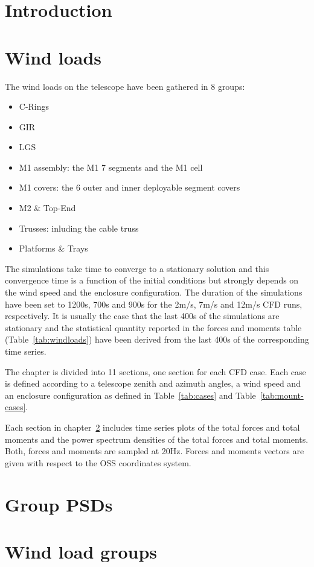 \documentclass{gmto-book}
\begin{document}
\clearpage

\chapter{Introduction}
\label{sec:introduction}



%
\chapter{Wind loads}
\label{cfd-wind-loads}

The wind loads on the telescope have been gathered in 8 groups:
\begin{itemize}
\item C-Rings
\item GIR
\item LGS
\item M1 assembly: the M1 7 segments and the M1 cell
\item M1 covers: the 6 outer and inner deployable segment covers
\item M2 \& Top-End
\item Trusses: inluding the cable truss
\item Platforms \& Trays
\end{itemize}

The simulations take time to converge to a stationary solution and this convergence time is a function of the initial conditions but strongly depends on the wind speed and the enclosure configuration.
The duration of the simulations have been set to 1200s, 700s and 900s for the 2m/s, 7m/s and 12m/s CFD runs, respectively.
It is usually the case that the last 400s of the simulations are stationary and
the statistical quantity reported in the forces and moments table (Table~\ref{tab:windloads}) have been derived from
the last 400s of the corresponding time series.

The chapter is divided into 11 sections, one section for each CFD case.
Each case is defined according to a telescope zenith and azimuth angles, a wind
speed and an enclosure configuration as defined in Table~\ref{tab:cases} and Table~\ref{tab:mount-cases}.

Each section in  chapter~\ref{cfd-wind-loads} includes time series plots of the total forces and total moments and the power spectrum densities of the total forces and total moments.
Both, forces and moments are sampled at 20Hz.
Forces and moments vectors are given with respect to the OSS coordinates system. 






\appendix

%

\chapter{Group PSDs}


\chapter{Wind load groups}



\printbibliography
\end{document}
